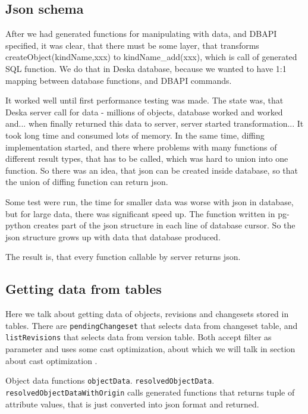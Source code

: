\documentclass[deska]{subfiles}
\begin{document}
\subsection{Json schema}
\label{sec:schema-json}
After we had generated functions for manipulating with data, and DBAPI specified, it was clear, that there must be some layer,
that transforms createObject(kindName,xxx) to kindName\_add(xxx), which is call of generated SQL function.
We do that in Deska database, because we wanted to have 1:1 mapping between database functions, and DBAPI commands.

It worked well until first performance testing was made. The state was, that Deska server call for data - millions of objects,
database worked and worked and... when finally returned this data to server, server started transformation... It took long time
and consumed lots of memory.
In the same time, diffing implementation started, and there where problems with many functions of different result types,
that has to be called, which was hard to union into one function.
So there was an idea, that json can be created inside database, so that the union of diffing function can return json.

Some test were run, the time for smaller data was worse with json in database, but for large data, there was significant
speed up. The function written in pg-python creates part of the json structure in each line of database cursor.
So the json structure grows up with data that database produced.

The result is, that every function callable by server returns json.

\subsection{Getting data from tables}
\label{sec:data-functions}
Here we talk about getting data of objects, revisions and changesets stored in tables.
There are {\tt pendingChangeset} that selects data from changeset table, and {\tt listRevisions} that selects data from version table.
Both accept filter as parameter and uses some cast optimization, about which we will talk in section about cast
optimization .

Object data functions {\tt objectData}. {\tt resolvedObjectData}. {\tt resolvedObjectDataWithOrigin} calls generated functions 
that returns tuple of attribute values, that is just converted into json format and returned. 
\end{document}
